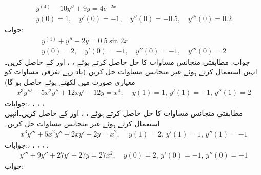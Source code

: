 \begin{align*}
y^{(4)}-10y''+9y=4e^{-2x}\\
y(0)=1, \quad y'(0)=-1,\quad y''(0)=-0.5,\quad y'''(0)=0.2
\end{align*}
جواب:
\begin{align*}
y^{(4)}+y''-2y=0.5\sin 2x\\
y(0)=2, \quad y'(0)=-1,\quad y''(0)=-1,\quad y'''(0)=2
\end{align*}
جواب:
مطابقتی متجانس مساوات  کا حل  حاصل کرتے ہوئے ، ،   اور  کے  حاصل کریں۔انہیں استعمال کرتے ہوئے غیر متجانس مساوات حل کریں۔(یاد رہے تفرقی مساوات کو معیاری صورت میں لکھتے ہوئے  حاصل ہو گا) 
\begin{align*}
x^3y'''-5x^2y''+12xy'-12y=x^4, \,\quad y(1)=1,\, y'(1)=-1,\,y''(1)=2
\end{align*}
جوابات:، ، ، ، \\
مطابقتی متجانس مساوات  کا حل  حاصل کرتے ہوئے ، ،   اور  کے  حاصل کریں۔انہیں استعمال کرتے ہوئے غیر متجانس مساوات حل کریں۔
\begin{align*}
x^3y'''+5x^2y''+2xy'-2y=x^2, \,\quad y(1)=2,\, y'(1)=1,\,y''(1)=-1
\end{align*}
جوابات:، ، ، ، ، 
\begin{align*}
y'''+9y''+27y'+27y=27x^2, \quad y(0)=2,\, y'(0)=-1,\, y''(0)=-1
\end{align*}
جواب:
